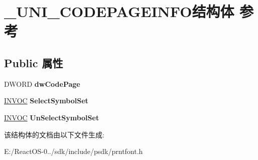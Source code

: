 \hypertarget{struct___u_n_i___c_o_d_e_p_a_g_e_i_n_f_o}{}\section{\+\_\+\+U\+N\+I\+\_\+\+C\+O\+D\+E\+P\+A\+G\+E\+I\+N\+F\+O结构体 参考}
\label{struct___u_n_i___c_o_d_e_p_a_g_e_i_n_f_o}
\subsection*{Public 属性}
\begin{DoxyCompactItemize}
\item 
\mbox{\label{struct___u_n_i___c_o_d_e_p_a_g_e_i_n_f_o_a95ec0fe154b14ec536f0ae243c75abc7}} 
D\+W\+O\+RD {\bfseries dw\+Code\+Page}
\item 
\mbox{\label{struct___u_n_i___c_o_d_e_p_a_g_e_i_n_f_o_a5260cbb8ad06e92b3f63d2ebcb5a5fde}} 
\hyperlink{struct___i_n_v_o_c}{I\+N\+V\+OC} {\bfseries Select\+Symbol\+Set}
\item 
\mbox{\label{struct___u_n_i___c_o_d_e_p_a_g_e_i_n_f_o_a388061e275a51397fc39ec7e48980a04}} 
\hyperlink{struct___i_n_v_o_c}{I\+N\+V\+OC} {\bfseries Un\+Select\+Symbol\+Set}
\end{DoxyCompactItemize}


该结构体的文档由以下文件生成\+:\begin{DoxyCompactItemize}
\item 
E\+:/\+React\+O\+S-\/0../sdk/include/psdk/prntfont.\+h\end{DoxyCompactItemize}
